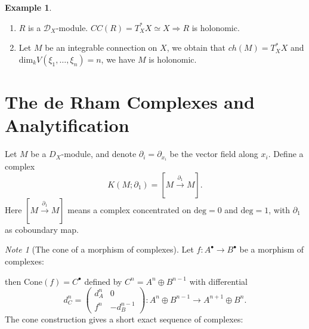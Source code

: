 \documentclass[openany]{book}
\theoremstyle{definition} %
\newtheorem{example}[theorem]{Example}       %
\theoremstyle{remark}
\newtheorem{note}[remark]{Note} %
\begin{document}
\begin{example}
    \quad
    \begin{enumerate}
        \item $R$ is a $\mathcal{D}_X$-module. $CC(R) = T^*_X X\simeq X \Rightarrow R$ is holonomic.
        \item Let $M$ be an integrable connection on $X$, we obtain that $ch(M)=T^{\ast}_{X}X$ and $\mathrm{dim}_{k}V(\xi_{1},\dots,\xi_{n})=n$, we have $M$ is holonomic.
    \end{enumerate}
\end{example}

\section{The de Rham Complexes and Analytification}

Let $M$ be a $D_X$-module, and denote $\partial_i = \partial_{x_i}$ be the vector field along $x_i$.
Define a complex $$K(M; \partial_1) = [M \xrightarrow{\partial_1} M].$$Here $[M\xrightarrow{\partial_{1}} M]$ means a complex concentrated on $\mathrm{deg}=0$ and $\mathrm{deg}=1$, with $\partial_{1}$ as coboundary map.

\quad

\begin{note}[The cone of a morphism of complexes]\label{note 6.2}
    Let $f: A^\bullet \longrightarrow B^\bullet$ be a morphism of complexes:

    \begin{center}
    \end{center}

    then $\mathrm{Cone}(f)=C^{\bullet}$ defined by $C^n = A^n \oplus B^{n-1}$ with differential $$d_C^n = \begin{pmatrix}
            d_A^n & 0          \\
            f^n   & -d_B^{n-1}
        \end{pmatrix}: A^n \oplus B^{n-1} \longrightarrow A^{n+1} \oplus B^n.$$The cone construction gives a short exact sequence of complexes:
    \begin{center}
    \end{center}
\end{note}
\end{document}
